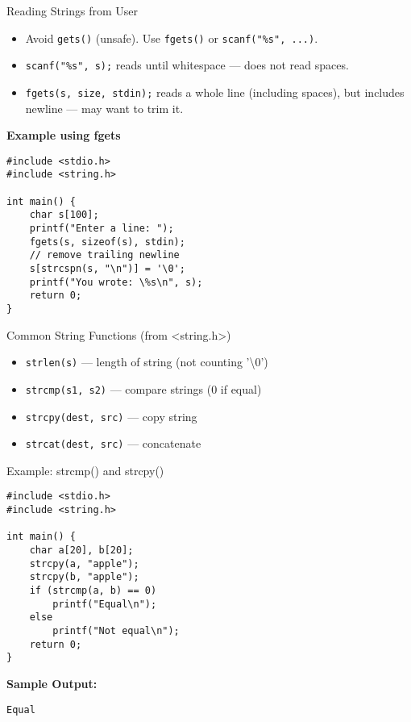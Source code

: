 \documentclass[12pt, aspectratio=169]{beamer}
\begin{document}
    \begin{frame}[fragile]{Reading Strings from User}
        \begin{itemize}
            \item Avoid \texttt{gets()} (unsafe). Use \texttt{fgets()} or \texttt{scanf("\%s", ...)}.
            \item \texttt{scanf("\%s", s);} reads until whitespace — does not read spaces.
            \item \texttt{fgets(s, size, stdin);} reads a whole line (including spaces), but includes newline — may want to trim it.
        \end{itemize}

        \textbf{Example using fgets}
        \begin{verbatim}
#include <stdio.h>
#include <string.h>

int main() {
    char s[100];
    printf("Enter a line: ");
    fgets(s, sizeof(s), stdin);
    // remove trailing newline
    s[strcspn(s, "\n")] = '\0';
    printf("You wrote: \%s\n", s);
    return 0;
}
        \end{verbatim}
    \end{frame}

    \begin{frame}[fragile]{Common String Functions (from <string.h>)}
        \begin{itemize}
            \item \texttt{strlen(s)} — length of string (not counting '\textbackslash0')
            \item \texttt{strcmp(s1, s2)} — compare strings (0 if equal)
            \item \texttt{strcpy(dest, src)} — copy string
            \item \texttt{strcat(dest, src)} — concatenate
        \end{itemize}
    \end{frame}

    \begin{frame}[fragile]{Example: strcmp() and strcpy()}
        \begin{verbatim}
#include <stdio.h>
#include <string.h>

int main() {
    char a[20], b[20];
    strcpy(a, "apple");
    strcpy(b, "apple");
    if (strcmp(a, b) == 0)
        printf("Equal\n");
    else
        printf("Not equal\n");
    return 0;
}
        \end{verbatim}

        \textbf{Sample Output:}
        \begin{verbatim}
Equal
        \end{verbatim}
    \end{frame}
\end{document}
